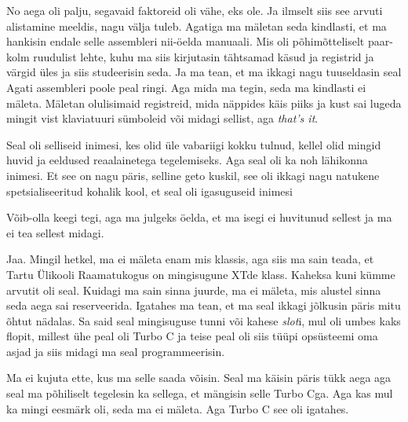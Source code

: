 
No aega oli palju, segavaid faktoreid oli vähe, eks ole. Ja ilmselt siis see 
arvuti alistamine meeldis, nagu välja tuleb. Agatiga ma 
mäletan seda kindlasti, et ma hankisin endale selle 
assembleri nii-öelda manuaali. Mis oli põhimõtteliselt 
paar-kolm ruudulist lehte, kuhu ma siis kirjutasin tähtsamad käsud ja registrid 
ja värgid üles ja siis studeerisin seda. Ja ma tean, et ma ikkagi nagu 
tuuseldasin seal Agati assembleri poole peal ringi. Aga mida ma tegin, seda ma 
kindlasti ei mäleta. Mäletan olulisimaid registreid, mida näppides käis piiks 
ja kust sai lugeda mingit vist klaviatuuri sümboleid või midagi sellist, aga 
\emph{that's it}.


Seal oli  selliseid inimesi, kes olid üle vabariigi kokku tulnud, kellel olid  
mingid huvid ja eeldused  reaalainetega tegelemiseks. Aga seal oli ka noh 
lähikonna inimesi. Et see on nagu päris, selline geto kuskil, see oli ikkagi 
nagu natukene spetsialiseeritud kohalik kool, et seal oli igasuguseid inimesi


Võib-olla keegi tegi, aga  ma julgeks öelda, et ma isegi ei huvitunud sellest 
ja ma ei tea sellest midagi. 


Jaa. Mingil hetkel, ma ei mäleta enam mis klassis, aga siis ma sain teada, et 
Tartu Ülikooli Raamatukogus on mingisugune 
XTde klass. Kaheksa kuni kümme arvutit oli seal. Kuidagi ma 
sain sinna juurde, ma ei mäleta, mis alustel sinna seda aega sai reserveerida. 
Igatahes ma tean, et ma seal ikkagi jõlkusin päris mitu õhtut nädalas. Sa 
said seal mingisuguse tunni või kahese \emph{slot}i, mul oli umbes kaks flopit, 
millest ühe peal oli Turbo C ja teise peal oli siis tüüpi 
opsüsteemi oma asjad ja siis  midagi ma seal programmeerisin. 


Ma ei kujuta ette, kus ma selle saada võisin. Seal ma käisin päris tükk 
aega aga seal ma põhiliselt tegelesin ka sellega, et mängisin selle Turbo Cga. 
Aga kas mul ka mingi eesmärk oli, seda ma ei mäleta. Aga Turbo C see oli 
igatahes.


